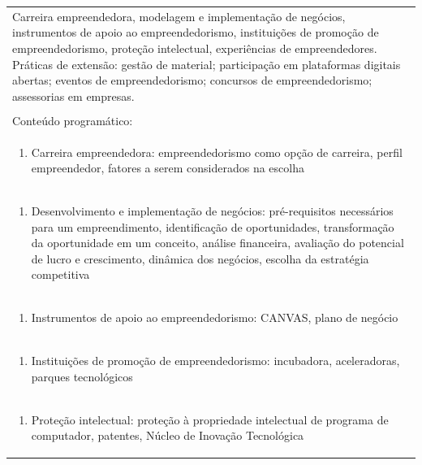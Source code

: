 \documentclass[11pt]{article}
\begin{document}
\begin{center}
\begin{longtable}{|p{4cm}|p{4cm}|p{4cm}|p{4cm}|}
\multicolumn{4}{|p{\dimexpr 16cm + 6\tabcolsep\relax}|}{Carreira empreendedora, modelagem e implementação de negócios, instrumentos de apoio ao empreendedorismo, instituições de promoção de empreendedorismo, proteção intelectual, experiências de empreendedores. Práticas de extensão: gestão de material; participação em plataformas digitais abertas; eventos de empreendedorismo; concursos de empreendedorismo; assessorias em empresas.}\\
\multicolumn{4}{|p{16cm}|}{}\\
\hline
\multicolumn{4}{|p{16cm}|}{Conteúdo programático:}\\*
\multicolumn{4}{|p{\dimexpr 16cm + 6\tabcolsep\relax}|}{\begin{enumerate}[start=1]\item Carreira empreendedora: empreendedorismo como opção de carreira, perfil empreendedor, fatores a serem considerados na escolha\end{enumerate}}\\
\multicolumn{4}{|p{\dimexpr 16cm + 6\tabcolsep\relax}|}{\begin{enumerate}[start=2]\item Desenvolvimento e implementação de negócios: pré-requisitos necessários para um empreendimento, identificação de oportunidades, transformação da oportunidade em um conceito, análise financeira, avaliação do potencial de lucro e crescimento, dinâmica dos negócios, escolha da estratégia competitiva\end{enumerate}}\\
\multicolumn{4}{|p{\dimexpr 16cm + 6\tabcolsep\relax}|}{\begin{enumerate}[start=3]\item Instrumentos de apoio ao empreendedorismo: CANVAS, plano de negócio\end{enumerate}}\\
\multicolumn{4}{|p{\dimexpr 16cm + 6\tabcolsep\relax}|}{\begin{enumerate}[start=4]\item Instituições de promoção de empreendedorismo: incubadora, aceleradoras, parques tecnológicos\end{enumerate}}\\
\multicolumn{4}{|p{\dimexpr 16cm + 6\tabcolsep\relax}|}{\begin{enumerate}[start=5]\item Proteção intelectual: proteção à propriedade intelectual de programa de computador, patentes, Núcleo de Inovação Tecnológica\end{enumerate}}\\

\end{longtable}
\end{center}
\end{document}
